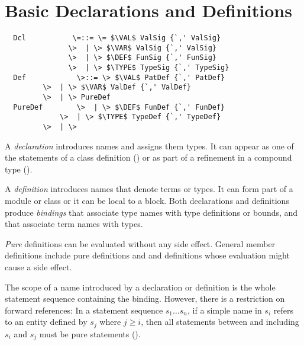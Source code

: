 \documentclass[11pt]{report}
\newcommand{\iflet}[1]{}
\begin{document}
\chapter{Basic Declarations and Definitions}
\label{sec:defs}

\syntax\begin{verbatim}
  Dcl           \=::= \= $\VAL$ ValSig {`,' ValSig}
               \>  | \> $\VAR$ ValSig {`,' ValSig}
               \>  | \> $\DEF$ FunSig {`,' FunSig}
               \>  | \> $\TYPE$ TypeSig {`,' TypeSig}
  Def            \>::= \> $\VAL$ PatDef {`,' PatDef}
		 \>  | \> $\VAR$ ValDef {`,' ValDef}
		 \>  | \> PureDef
  PureDef        \>  | \> $\DEF$ FunDef {`,' FunDef}
       		 \>  | \> $\TYPE$ TypeDef {`,' TypeDef}
		 \>  | \>
\end{verbatim}
\iflet{$\LET$ ValDef {`,' ValDef}}

A {\em declaration} introduces names and assigns them types. It can
appear as one of the statements of a class definition
() or as part of a refinement in a compound
type ().

A {\em definition} introduces names
that denote terms or types. It can form part of a module or class or
it can be local to a block.  Both declarations and definitions produce
{\em bindings} that associate type names with type definitions or
bounds, and that associate term names with types.

{\em Pure} definitions can be evaluated without any side effect.
General member definitions include pure definitions and
\verb@val@ and \verb@var@ definitions whose evaluation might cause a
side effect.

The scope of a name introduced by a declaration or definition is the
whole statement sequence containing the binding.  However, there is a
restriction on forward references: In a statement sequence $s_1 \ldots
s_n$, if a simple name in $s_i$ refers to an entity defined by $s_j$
where $j \geq i$, then all statements between and including $s_i$ and
$s_j$ must be pure statements ().

\end{document}
